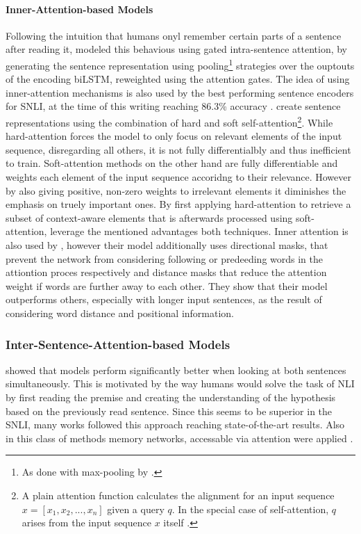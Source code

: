 \paragraph*{Inner-Attention-based Models}
Following the intuition that humans onyl remember certain parts of a sentence after reading it, \cite{chen2017recurrent} modeled this behavious using gated intra-sentence attention, by generating the sentence representation using pooling\footnote{As done with max-pooling by \cite{nie2017shortcut}.} strategies over the ouptouts of the encoding \ac{biLSTM}, reweighted using the attention gates. The idea of using inner-attention mechanisms is also used by the best performing sentence encoders for \ac{SNLI}, at the time of this writing reaching 86.3\% accuracy \citep{shen2018reinforced,im2017distance}. \cite{shen2018reinforced} create sentence representations using the combination of hard and soft self-attention\footnote{A plain attention function calculates the alignment for an input sequence $x=[x_1, x_2, ...,x_n]$ given a query $q$. In the special case of self-attention, $q$ arises from the input sequence $x$ itself \citep{shen2018reinforced}.}. While hard-attention forces the model to only focus on relevant elements of the input sequence, disregarding all others, it is not fully differentialbly and thus inefficient to train. Soft-attention methods on the other hand are fully differentiable and weights each element of the input sequence accoridng to their relevance. However by also giving positive, non-zero weights to irrelevant elements it diminishes the emphasis on truely important ones. By first applying hard-attention to retrieve a subset of context-aware elements that is afterwards processed using soft-attention, \cite{shen2018reinforced} leverage the mentioned advantages both techniques. Inner attention is also used by \cite{im2017distance}, however their model additionally uses directional masks, that prevent the network from considering following or predeeding words in the attiontion proces respectively and distance masks that reduce the attention weight if words are further away to each other. They show that their model outperforms others, especially with longer input sentences, as the result of considering word distance and positional information.

\subsubsection{Inter-Sentence-Attention-based Models}
\cite{rocktaschel2015reasoning} showed that models perform significantly better when looking at both sentences simultaneously. This is motivated by the way humans would solve the task of \ac{NLI} by first reading the premise and creating the understanding of the hypothesis based on the previously read sentence. Since this seems to be superior in the \ac{SNLI}, many works followed this approach reaching state-of-the-art results. Also in this class of methods memory networks, accessable via attention were applied \citep{cheng2016long}.

